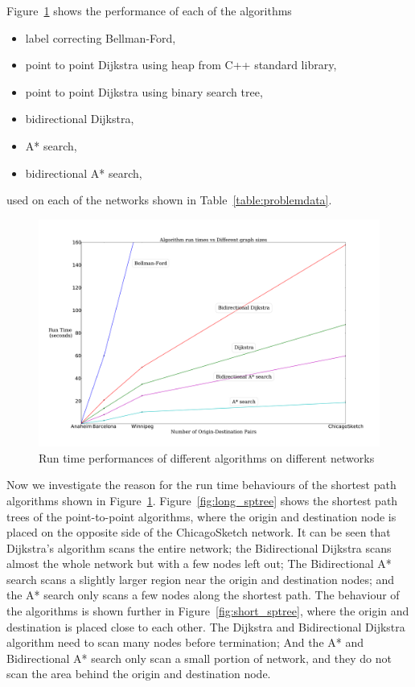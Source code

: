 Figure~\ref{fig:allresults} shows the performance of each of the algorithms
\begin{itemize}
    \item label correcting Bellman-Ford,
    \item point to point Dijkstra using heap from C++ standard library,
    \item point to point Dijkstra using binary search tree,
    \item bidirectional Dijkstra,
    \item A* search,
    \item bidirectional A* search,
\end{itemize}
used on each of the networks shown in Table~\ref{table:problemdata}.
\begin{figure}[H]
    \centering
    \includegraphics[width=\textwidth]{img/runtime}
    \caption{Run time performances of different algorithms on different networks}
    \label{fig:allresults}
\end{figure}

Now we investigate the reason for the run time behaviours of the shortest path algorithms shown in Figure~\ref{fig:allresults}.
Figure~\ref{fig:long_sptree} shows the shortest path trees of the point-to-point algorithms, where the origin and destination node is placed on the opposite side of the ChicagoSketch network.
It can be seen that Dijkstra's algorithm scans the entire network;
the Bidirectional Dijkstra scans almost the whole network but with a few nodes left out;
The Bidirectional A* search scans a slightly larger region near the origin and destination nodes;
and the A* search only scans a few nodes along the shortest path.
The behaviour of the algorithms is shown further in Figure~\ref{fig:short_sptree},
where the origin and destination is placed close to each other.
The Dijkstra and Bidirectional Dijkstra algorithm need to scan many nodes before termination;
And the A* and Bidirectional A* search only scan a small portion of network,
and they do not scan the area behind the origin and destination node.

